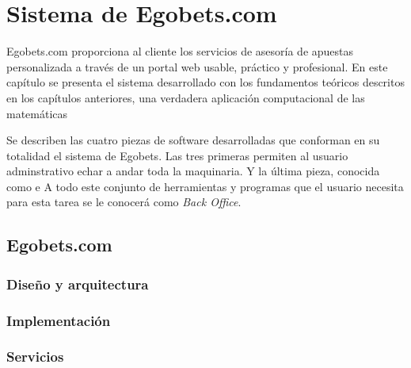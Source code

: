 \chapter{Sistema de Egobets.com}
\label{chap:software}
\graphicspath{{/Users/brunomedina/Dropbox/Tesis-Egobets/egobets-notas/resources/diagramas/}}

Egobets.com proporciona al cliente los servicios de asesoría de apuestas personalizada a través de un portal web usable, práctico y profesional. En este capítulo se presenta el sistema desarrollado con los fundamentos teóricos descritos en los capítulos anteriores, una verdadera aplicación computacional de las matemáticas

Se describen las cuatro piezas de software desarrolladas que conforman en su totalidad el sistema de Egobets. Las tres primeras permiten al usuario adminstrativo echar a andar toda la maquinaria. Y la última pieza, conocida como e 
A todo este conjunto de herramientas y programas que el usuario necesita para esta tarea se le conocerá como \emph{Back Office}.





\section{Egobets.com}
\label{sec:egobets-com}

\subsection{Diseño y arquitectura}
\label{sec:design}

\subsection{Implementación}
\label{sec:implementation}

\subsection{Servicios}
\label{sec:services}

